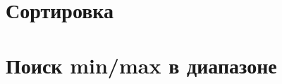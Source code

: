\documentclass[12pt, a4paper]{article}
\begin{document}























\newpage
\section{Сортировка}














\newpage
\section{Поиск min/max в диапазоне}

\end{document}
